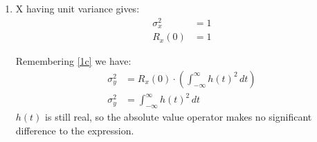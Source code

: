 \documentclass[a4paper, twoside, fleqn]{scrartcl}
\begin{document}
\begin{enumerate}
    \item
      \label{1d}
      X having unit variance gives:
      \begin{align}
        \sigma_x^2 &= 1 \\
        R_x(0) &= 1 
      \end{align}
      
      Remembering \ref{1c} we have:
      \begin{align}
        \sigma_y^2 &= R_x(0) \cdot \left( \int_{-\infty}^{\infty} h(t)^2 \, dt \right) \\
        \sigma_y^2 &= \int_{-\infty}^{\infty} h(t)^2 \, dt 
      \end{align}
      $h(t)$ is still real, so the absolute value operator makes no significant difference to the expression.
  \end{enumerate}
  
\end{document}
